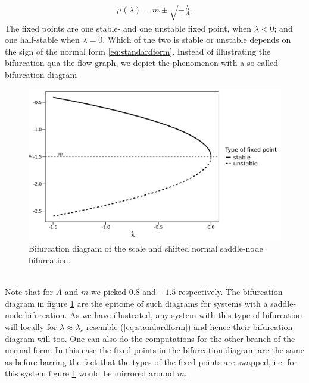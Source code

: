 \begin{align}
    \mu\left(\lambda\right) = m \pm \sqrt{-\frac{\lambda}{A}}. \label{eq:fixedPoint}
\end{align}
The fixed points are one stable- and one unstable fixed point, when $\lambda<0$; and one half-stable when $\lambda=0$. Which of the two is stable or unstable depends on the sign of the normal form \ref{eq:standardform}. Instead of illustrating the bifurcation qua the flow graph, we depict the phenomenon with a so-called bifurcation diagram\\
\begin{figure}[h]
\begin{center}
    \includegraphics[scale = .125]{figures/bifurcation_diagram.jpeg}
    \caption{Bifurcation diagram of the scale and shifted normal saddle-node bifurcation.}
    \label{figure:bifurcationDiagram}
\end{center}
\end{figure}\\
Note that for $A$ and $m$ we picked $0.8$ and $-1.5$ respectively. The bifurcation diagram in figure \ref{figure:bifurcationDiagram} are the epitome of such diagrams for systems with a saddle-node bifurcation. As we have illustrated, any system with this type of bifurcation will locally for $\lambda \approx \lambda_c$ resemble (\ref{eq:standardform}) and hence their bifurcation diagram will too. One can also do the computations for the other branch of the normal form. In this case the fixed points in the bifurcation diagram are the same as before barring the fact that the types of the fixed points are swapped, i.e. for this system figure \ref{figure:bifurcationDiagram} would be mirrored around $m$.
